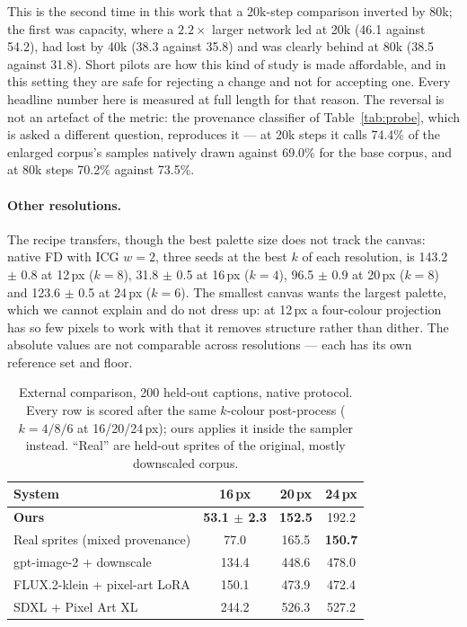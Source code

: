 \documentclass[10pt,twocolumn,letterpaper]{article}
\begin{document}
This is the second time in this work that a 20k-step comparison inverted by 80k; the first was capacity, where a
$2.2\times$ larger network led at 20k (46.1 against 54.2), had lost by 40k (38.3 against 35.8) and was clearly behind
at 80k (38.5 against 31.8). Short pilots are how this kind of study is made affordable, and in this setting they are
safe for rejecting a change and not for accepting one. Every headline number here is measured at full length for that
reason. The reversal is not an artefact of the metric: the provenance classifier of Table~\ref{tab:probe}, which is
asked a different question, reproduces it --- at 20k steps it calls 74.4\% of the enlarged corpus's samples natively
drawn against 69.0\% for the base corpus, and at 80k steps 70.2\% against 73.5\%.

\paragraph{Other resolutions.}
The recipe transfers, though the best palette size does not track the canvas: native FD with ICG $w{=}2$, three seeds
at the best $k$ of each resolution, is 143.2 $\pm$ 0.8 at 12\,px ($k{=}8$), 31.8 $\pm$ 0.5 at 16\,px ($k{=}4$),
96.5 $\pm$ 0.9 at 20\,px ($k{=}8$) and 123.6 $\pm$ 0.5 at 24\,px ($k{=}6$). The smallest canvas wants the largest palette, which we cannot explain
and do not dress up: at 12\,px a four-colour projection has so few pixels to work with that it removes structure
rather than dither. The absolute values are not comparable across resolutions --- each has its own
reference set and floor.

\begin{table}[t]
\caption{External comparison, 200 held-out captions, native protocol. Every row is scored after the same $k$-colour
post-process ($k = 4/8/6$ at 16/20/24\,px); ours applies it inside the sampler instead. ``Real'' are held-out sprites
of the original, mostly downscaled corpus.}
\label{tab:external}
\centering
\small
\begin{tabular}{@{}lccc@{}}
\toprule
System & 16\,px & 20\,px & 24\,px \\
\midrule
\textbf{Ours} & \textbf{53.1 $\pm$ 2.3} & \textbf{152.5} & 192.2 \\
Real sprites (mixed provenance) & 77.0 & 165.5 & \textbf{150.7} \\
gpt-image-2 + downscale & 134.4 & 448.6 & 478.0 \\
FLUX.2-klein + pixel-art LoRA & 150.1 & 473.9 & 472.4 \\
SDXL + Pixel Art XL & 244.2 & 526.3 & 527.2 \\
\bottomrule
\end{tabular}
\end{table}
\end{document}
